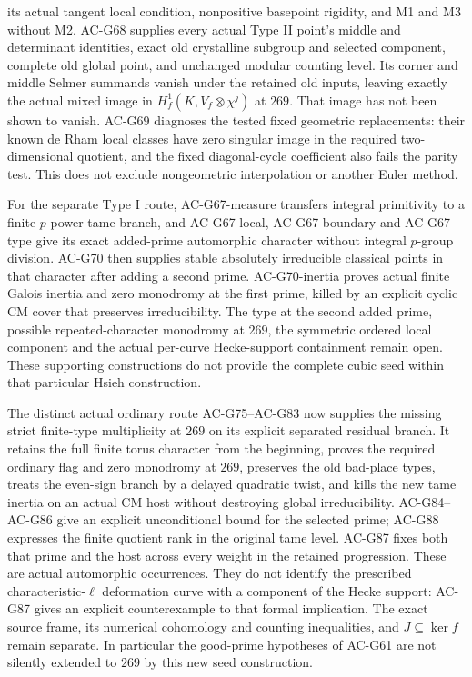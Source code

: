 \documentclass[11pt,a4paper]{article}
\theoremstyle{definition}
\theoremstyle{remark}
\begin{document}
its actual tangent local condition, nonpositive basepoint rigidity,
and M1 and M3 without M2. AC-G68 supplies every actual Type II
point's middle and determinant identities, exact old crystalline
subgroup and selected component, complete old global point, and
unchanged modular counting level. Its corner and middle Selmer
summands vanish under the retained old inputs, leaving exactly the
actual mixed image in $H_f^1(K,V_f\otimes\chi^j)$ at $269$.
That image has not been shown to vanish. AC-G69 diagnoses the tested
fixed geometric replacements: their known de Rham local classes
have zero singular image in the required two-dimensional quotient,
and the fixed diagonal-cycle coefficient also fails the parity test.
This does not exclude nongeometric interpolation or another Euler method.

For the separate Type I route, AC-G67-measure transfers integral
primitivity to a finite $p$-power tame branch, and
AC-G67-local, AC-G67-boundary and AC-G67-type give its exact added-prime
automorphic character without integral $p$-group division.
AC-G70 then supplies stable absolutely irreducible classical points in
that character after adding a second prime. AC-G70-inertia proves actual
finite Galois inertia and zero monodromy at the first prime, killed by an
explicit cyclic CM cover that preserves irreducibility. The type at the
second added prime, possible repeated-character monodromy at $269$, the
symmetric ordered local component and the actual per-curve Hecke-support
containment remain open. These supporting constructions do not provide
the complete cubic seed within that particular Hsieh construction.

The distinct actual ordinary route AC-G75--AC-G83 now supplies
the missing strict finite-type multiplicity at $269$ on its
explicit separated residual branch.  It retains the full finite
torus character from the beginning, proves the required ordinary
flag and zero monodromy at $269$, preserves the old bad-place
types, treats the even-sign branch by a delayed quadratic twist,
and kills the new tame inertia on an actual CM host without
destroying global irreducibility.  AC-G84--AC-G86 give an explicit
unconditional bound for the selected prime; AC-G88 expresses the
finite quotient rank in the original tame level.  AC-G87 fixes
both that prime and the host across every weight in the retained
progression.  These are actual automorphic occurrences.  They do
not identify the prescribed characteristic-$\ell$ deformation
curve with a component of the Hecke support: AC-G87 gives an
explicit counterexample to that formal implication.  The exact
source frame, its numerical cohomology and counting inequalities,
and $J\subseteq\ker f$ remain separate.  In particular the
good-prime hypotheses of AC-G61 are not silently extended to
$269$ by this new seed construction.
\end{document}
